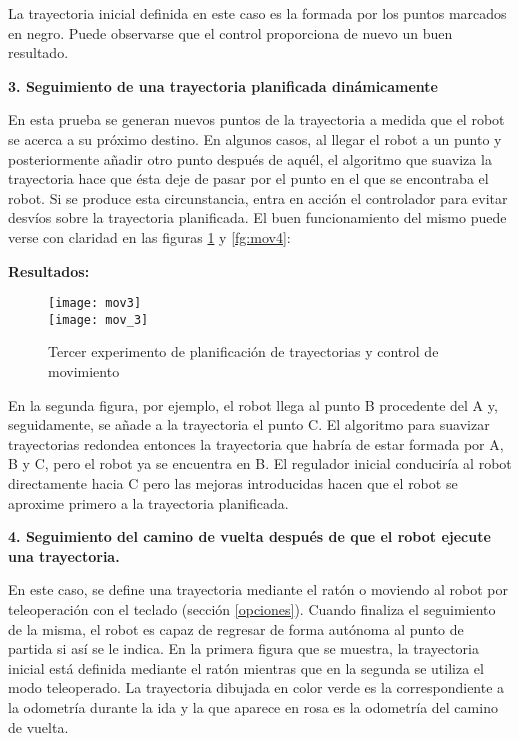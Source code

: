 La trayectoria inicial definida en este caso es la formada por los puntos marcados en negro. Puede observarse que el control proporciona de nuevo un buen resultado.

\noindent
\textbf{\textbf{3.} Seguimiento de una trayectoria planificada dinámicamente}

En esta prueba se generan nuevos puntos de la trayectoria a medida que el robot se acerca a su próximo destino. En algunos casos, al llegar el robot a un punto y posteriormente añadir otro punto después de aquél, el algoritmo que suaviza la trayectoria hace que ésta deje de pasar por el punto en el que se encontraba el robot. Si se produce esta circunstancia, entra en acción el controlador para evitar desvíos sobre la trayectoria planificada. El buen funcionamiento del mismo puede verse con claridad en las figuras \ref{fg:mov3} y \ref{fg:mov4}:



\textbf{Resultados:}
\begin{figure}[h]
  \centering\texttt{[image: mov3]}\\
  \vspace{2cm}\texttt{[image: mov\_3]}
  \caption{Tercer experimento de planificación de trayectorias y control de movimiento}\label{fg:mov3}
\end{figure}


En la segunda figura, por ejemplo, el robot llega al punto B procedente del A y, seguidamente, se añade a la trayectoria el punto C. El algoritmo para suavizar trayectorias redondea entonces la trayectoria que habría de estar formada por A, B y C, pero el robot ya se encuentra en B. El regulador inicial conduciría al robot directamente hacia C pero las mejoras introducidas hacen que el robot se aproxime primero a la trayectoria planificada.

\noindent
\textbf{\textbf{4.} Seguimiento del camino de vuelta después de que el robot ejecute una trayectoria.}

En este caso, se define una trayectoria mediante el ratón o moviendo al robot por teleoperación con el teclado (sección \ref{opciones}). Cuando finaliza el seguimiento de la misma, el robot es capaz de regresar de forma autónoma al punto de partida si así se le indica. En la primera figura que se muestra, la trayectoria inicial está definida mediante el ratón mientras que en la segunda se utiliza el modo teleoperado. La trayectoria dibujada en color verde es la correspondiente a la odometría durante la ida y la que aparece en rosa es la odometría del camino de vuelta.

